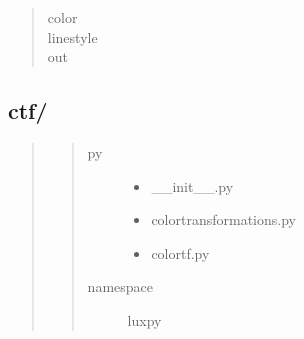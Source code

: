 \documentclass[letterpaper,10pt,english]{sphinxmanual}
\begin{document}
\begin{fulllineitems}
\begin{description}
\begin{quote}
\begin{description}
\item[{color}] \leavevmode
{}

\item[{linestyle}] \leavevmode
{}

\item[{out}] \leavevmode
{}

\end{description}\end{quote}

\end{description}

\end{fulllineitems}



\subsection{ctf/}
\label{\detokenize{color:ctf}}\begin{quote}
\begin{quote}\begin{description}
\item[{py}] \leavevmode\begin{itemize}
\item {} 
\_\_init\_\_.py

\item {} 
colortransformations.py

\item {} 
colortf.py

\end{itemize}

\item[{namespace}] \leavevmode
luxpy

\end{description}\end{quote}
\end{quote}
\label{\detokenize{color:module-luxpy.color.ctf.colortransforms}}
\end{document}

